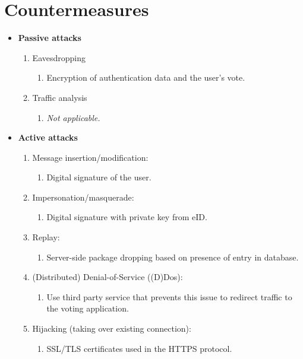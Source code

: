 \section{Countermeasures}
\label{sec:countermeasures}
\begin{itemize}
    \item \textbf{Passive attacks}
    \begin{enumerate}
        \item Eavesdropping
        \begin{enumerate}
            \item Encryption of authentication data and the user's vote.
        \end{enumerate}
        
        \item Traffic analysis
        \begin{enumerate}
            \item \textit{Not applicable.}
        \end{enumerate}
    \end{enumerate}
    
    \item \textbf{Active attacks}
    \begin{enumerate}
        \item Message insertion/modification:
        \begin{enumerate}
            \item Digital signature of the user.
        \end{enumerate}
        
        \item Impersonation/masquerade:
        \begin{enumerate}
            \item Digital signature with private key from eID.
        \end{enumerate}
        
        \item Replay:
        \begin{enumerate}
            \item Server-side package dropping based on presence of entry in database.
        \end{enumerate}
        
        \item (Distributed) Denial-of-Service ((D)Dos):
        \begin{enumerate}
            \item Use third party service that prevents this issue to redirect traffic to the voting application.
        \end{enumerate}
        
        \item Hijacking (taking over existing connection):
        \begin{enumerate}
            \item SSL/TLS certificates used in the HTTPS protocol.
        \end{enumerate}
    \end{enumerate}
\end{itemize}